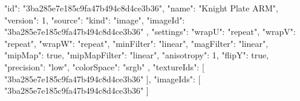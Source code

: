 {
  "id": "3ba285e7e185c9fa47b494c8d4ce3b36",
  "name": "Knight Plate ARM",
  "version": 1,
  "source": {
    "kind": "image",
    "imageId": "3ba285e7e185c9fa47b494c8d4ce3b36"
  },
  "settings": {
    "wrapU": "repeat",
    "wrapV": "repeat",
    "wrapW": "repeat",
    "minFilter": "linear",
    "magFilter": "linear",
    "mipMap": true,
    "mipMapFilter": "linear",
    "anisotropy": 1,
    "flipY": true,
    "precision": "low",
    "colorSpace": "srgb"
  },
  "textureIds": [
    "3ba285e7e185c9fa47b494c8d4ce3b36"
  ],
  "imageIds": [
    "3ba285e7e185c9fa47b494c8d4ce3b36"
  ]
}
